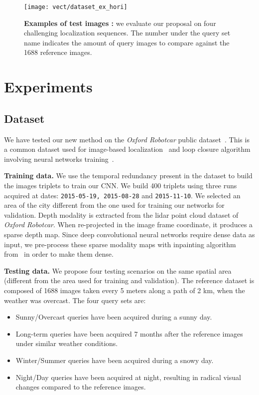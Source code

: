 \begin{figure}
	\center
	\texttt{[image: vect/dataset\_ex\_hori]}
	\caption{\label{fig:dataset} \textbf{Examples of test images :} we evaluate our proposal on four challenging localization sequences. The number under the query set name indicates the amount of query images to compare against the 1688 reference images.}
\end{figure}

\section{Experiments}
\label{sec:experiments}

\subsection{Dataset}
\label{subsec:dataset}
	We have tested our new method on the \textit{Oxford Robotcar} public dataset~\cite{Maddern2016}. This is a common dataset used for image-based localization~\cite{Sattler2018} and loop closure algorithm involving neural networks training~\cite{Porav2018}.
		
\vspace{4pt}\noindent\textbf{Training data.}
	We use the temporal redundancy present in the dataset to build the images triplets to train our CNN. We build 400 triplets using three runs acquired at dates: \texttt{2015-05-19, 2015-08-28} and \texttt{2015-11-10}. We selected an area of the city different from the one used for training our networks for validation.
	Depth modality is extracted from the lidar point cloud dataset of \textit{Oxford Robotcar}. When re-projected in the image frame coordinate, it produces a sparse depth map. Since deep convolutional neural networks require dense data as input, we pre-process these sparse modality maps with inpainting algorithm from~\cite{Bevilacqua2017} in order to make them dense.

\vspace{4pt}\noindent\textbf{Testing data.} We propose four testing scenarios on the same spatial area (different from the area used for training and validation). The reference dataset is composed of 1688 images taken every 5 meters along a path of 2 km, when the weather was overcast. The four query sets are:
\begin{itemize}
	\item {Sunny/Overcast} queries have been acquired during a sunny day.
	\item {Long-term} queries have been acquired 7 months after the reference images under similar weather conditions.
	\item {Winter/Summer} queries have been acquired during a snowy day.
	\item {Night/Day} queries have been acquired at night, resulting in radical visual changes compared to the reference images.
\end{itemize}

